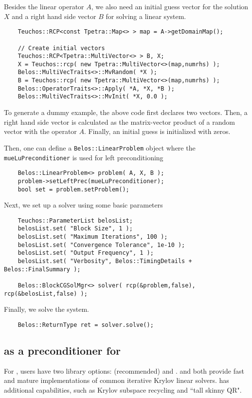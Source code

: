 Besides the linear operator $A$, we also need an initial guess vector for the
solution $X$ and a right hand side vector $B$ for solving a linear system.
\begin{lstlisting}
    Teuchos::RCP<const Tpetra::Map<> > map = A->getDomainMap();

    // Create initial vectors
    Teuchos::RCP<Tpetra::MultiVector<> > B, X;
    X = Teuchos::rcp( new Tpetra::MultiVector<>(map,numrhs) );
    Belos::MultiVecTraits<>::MvRandom( *X );
    B = Teuchos::rcp( new Tpetra::MultiVector<>(map,numrhs) );
    Belos::OperatorTraits<>::Apply( *A, *X, *B );
    Belos::MultiVecTraits<>::MvInit( *X, 0.0 );
\end{lstlisting}
To generate a dummy example, the above code first declares two vectors. Then, a
right hand side vector is calculated as the matrix-vector product of a random vector
with the operator $A$. Finally, an initial guess is initialized with zeros.

Then, one can define a \texttt{Belos::LinearProblem} object where the
\texttt{mueLuPreconditioner} is used for left preconditioning
\begin{lstlisting}
    Belos::LinearProblem<> problem( A, X, B );
    problem->setLeftPrec(mueLuPreconditioner);
    bool set = problem.setProblem();
\end{lstlisting}

Next, we set up a \belos{} solver using some basic parameters
\begin{lstlisting}
    Teuchos::ParameterList belosList;
    belosList.set( "Block Size", 1 );
    belosList.set( "Maximum Iterations", 100 );
    belosList.set( "Convergence Tolerance", 1e-10 );
    belosList.set( "Output Frequency", 1 );
    belosList.set( "Verbosity", Belos::TimingDetails + Belos::FinalSummary );

    Belos::BlockCGSolMgr<> solver( rcp(&problem,false), rcp(&belosList,false) );
\end{lstlisting}

Finally, we solve the system.
\begin{lstlisting}
    Belos::ReturnType ret = solver.solve();
\end{lstlisting}

\subsection{\muelu{} as a preconditioner for \aztecoo}

For \epetra, users have two library options: \belos{} (recommended) and \aztecoo{}.
\aztecoo{} and \belos both provide fast and mature implementations of common iterative Krylov linear solvers.
\belos has additional capabilities, such as Krylov subspace recycling and ``tall skinny QR".

